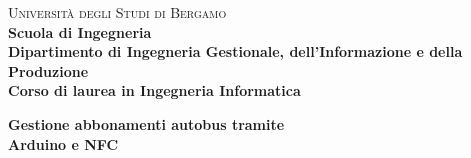 \begin{titlepage}

        \noindent
        \begin{minipage}[t]{0.19\textwidth}
        \end{minipage}
        \begin{minipage}[t]{0.81\textwidth}
        {
                {\textsc{Università degli Studi di Bergamo}} \\
                \textbf{Scuola di Ingegneria} \\
                \textbf{Dipartimento di Ingegneria Gestionale, dell'Informazione e della Produzione} \\
                \textbf{Corso di laurea in Ingegneria Informatica} \\
                \par
        }
        \end{minipage}

	\vspace{40mm}

	\begin{center}
            {\LARGE{
                    \textbf{Gestione abbonamenti autobus tramite \\Arduino e NFC}
                    \par 
            }}
        \end{center}


\end{titlepage}
